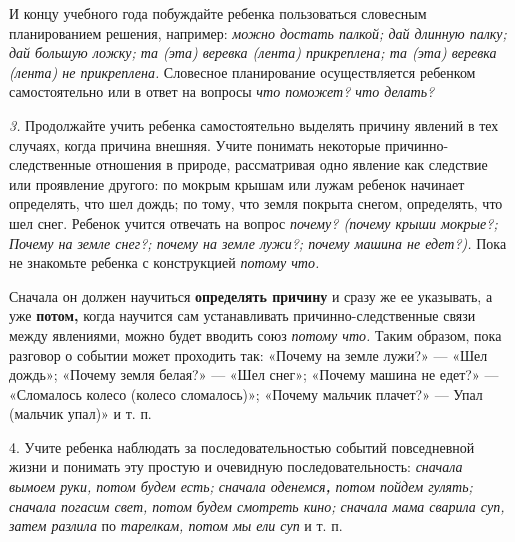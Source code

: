 \documentclass[a5paper]{book}
\renewcommand{\emph}[1]{\textit{#1}}
\begin{document}
И концу учебного года побуждайте ребенка пользоваться словесным
планированием решения, например: \emph{можно достать палкой; дай длинную
палку; дай большую ложку; та (эта) веревка (лента) прикреплена; та (эта)
веревка (лента) не прикреплена.} Словесное планирование осуществляется
ребенком самостоятельно или в ответ на вопросы \emph{что поможет? что
делать?}

\emph{3.} Продолжайте учить ребенка самостоятельно выделять причину
явлений в тех случаях, когда причина внешняя. Учите понимать некоторые
причинно-следственные отношения в природе, рассматривая одно явление как
следствие или проявление другого: по мокрым крышам или лужам ребенок
начинает определять, что шел дождь; по тому, что земля покрыта снегом,
определять, что шел снег. Ребенок учится отвечать на вопрос
\emph{почему? (почему крыши мокрые?; Почему на земле снег?; почему на
земле лужи?; почему машина не едет?).} Пока не знакомьте ребенка с
конструкцией \emph{потому что.}

Сначала он должен научиться \textbf{определять причину} и сразу же ее
указывать, а уже \textbf{потом,} когда научится сам устанавливать
причинно-следственные связи между явлениями, можно будет вводить союз
\emph{потому что.} Таким образом, пока разговор о событии может
проходить так: «Почему на земле лужи?» --- «Шел дождь»; «Почему земля
белая?» --- «Шел снег»; «Почему машина не едет?» --- «Сломалось колесо
(колесо сломалось)»; «Почему мальчик плачет?» --- Упал (мальчик упал)» и
т. п.

4. Учите ребенка наблюдать за последовательностью событий повседневной
жизни и понимать эту простую и очевидную последовательность:
\emph{сначала вымоем руки, потом будем есть; сначала оденемся\textbf{,}
потом пойдем гулять; сначала погасим свет, потом будем смотреть кино;
сначала мама сварила суп, затем разлила} по \emph{тарелкам, потом мы ели
суп} и т. п.
\end{document}

